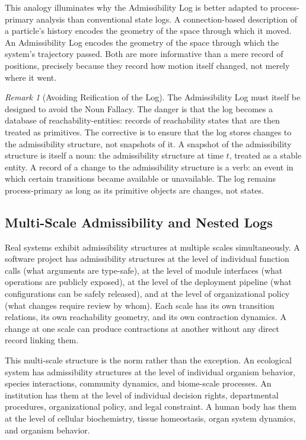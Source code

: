 \documentclass[12pt, a4paper]{article}
\theoremstyle{plain}
\theoremstyle{definition}
\theoremstyle{remark}
\newtheorem{remark}[theorem]{Remark}
\begin{document}
This analogy illuminates why the Admissibility Log is better adapted to
process-primary analysis than conventional state logs. A connection-based
description of a particle's history encodes the geometry of the space through
which it moved. An Admissibility Log encodes the geometry of the space through
which the system's trajectory passed. Both are more informative than a mere
record of positions, precisely because they record how motion itself changed,
not merely where it went.

\begin{remark}[Avoiding Reification of the Log]
The Admissibility Log must itself be designed to avoid the Noun Fallacy.
The danger is that the log becomes a database of reachability-entities:
records of reachability states that are then treated as primitives.
The corrective is to ensure that the log stores changes to the admissibility
structure, not snapshots of it. A snapshot of the admissibility structure
is itself a noun: the admissibility structure at time $t$, treated as a
stable entity. A record of a change to the admissibility structure is a verb:
an event in which certain transitions became available or unavailable.
The log remains process-primary as long as its primitive objects are changes,
not states.
\end{remark}

\subsection{Multi-Scale Admissibility and Nested Logs}

Real systems exhibit admissibility structures at multiple scales simultaneously.
A software project has admissibility structures at the level of individual
function calls (what arguments are type-safe), at the level of module
interfaces (what operations are publicly exposed), at the level of the
deployment pipeline (what configurations can be safely released), and at
the level of organizational policy (what changes require review by whom).
Each scale has its own transition relations, its own reachability geometry,
and its own contraction dynamics. A change at one scale can produce
contractions at another without any direct record linking them.

This multi-scale structure is the norm rather than the exception. An
ecological system has admissibility structures at the level of individual
organism behavior, species interactions, community dynamics, and biome-scale
processes. An institution has them at the level of individual decision
rights, departmental procedures, organizational policy, and legal constraint.
A human body has them at the level of cellular biochemistry, tissue
homeostasis, organ system dynamics, and organism behavior.
\end{document}
